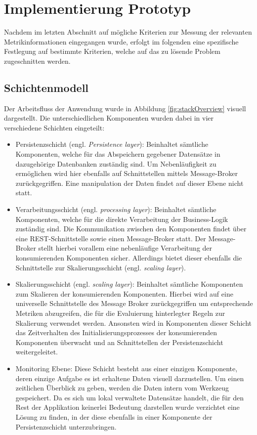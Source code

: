 \section{Implementierung Prototyp}

Nachdem im letzten Abschnitt auf mögliche Kriterien zur Messung der relevanten Metrikinformationen eingegangen wurde, erfolgt im folgenden eine spezifische Festlegung auf bestimmte Kriterien, welche auf das zu lösende Problem zugeschnitten werden.

\subsection{Schichtenmodell}
Der Arbeitsfluss der Anwendung wurde in Abbildung \ref{fig:stackOverview} visuell dargestellt. Die unterschiedlichen Komponenten wurden dabei in vier verschiedene Schichten eingeteilt: 

\begin{itemize}
  \item Persistenzschicht (engl. \emph{Persistence layer}): Beinhaltet sämtliche Komponenten, welche für das Abspeichern gegebener Datensätze in dazugehörige Datenbanken zuständig sind. Um Nebenläufigkeit zu ermöglichen wird hier ebenfalls auf Schnittstellen mittels Message-Broker zurückgegriffen. Eine manipulation der Daten findet auf dieser Ebene nicht statt.
  \item Verarbeitungsschicht (engl. \emph{processing layer}): Beinhaltet sämtliche Komponenten, welche für die direkte Verarbeitung der Business-Logik zuständig sind. Die Kommunikation zwischen den Komponenten findet über eine REST-Schnittstelle sowie einen Message-Broker statt. Der Message-Broker stellt hierbei vorallem eine nebenläufige Verarbeitung der konsumierenden Komponenten sicher. Allerdings bietet dieser ebenfalls die Schnittstelle zur Skalierungsschicht (engl. \emph{scaling layer}).
  \item Skalierungsschicht (engl. \emph{scaling layer}): Beinhaltet sämtliche Komponenten zum Skalieren der konsumierenden Komponenten. Hierbei wird auf eine universelle Schnittstelle des Message Broker zurückgegriffen um entsprechende Metriken abzugreifen, die für die Evaluierung hinterlegter Regeln zur Skalierung verwendet werden. Ansonsten wird in Komponenten dieser Schicht das Zeitverhalten des Initialisierungsprozesses der konsumierenden Komponenten überwacht und an Schnittstellen der Persistenzschicht weitergeleitet.
  \item Monitoring Ebene: Diese Schicht besteht aus einer einzigen Komponente, deren einzige Aufgabe es ist erhaltene Daten visuell darzustellen. Um einen zeitlichen Überblick zu geben, werden die Daten intern vom Werkzeug gespeichert. Da es sich um lokal verwaltete Datensätze handelt, die für den Rest der Applikation keinerlei Bedeutung darstellen wurde verzichtet eine Lösung zu finden, in der diese ebenfalls in einer Komponente der Persistenzschicht unterzubringen.
\end{itemize}

